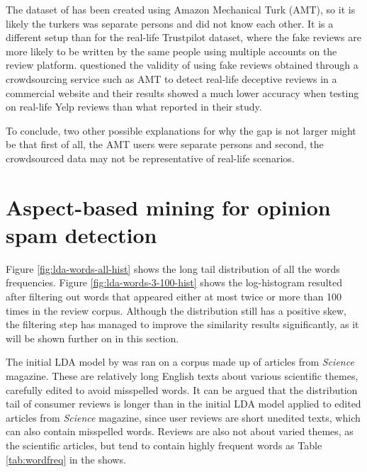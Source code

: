 The dataset of \citet{Ott2011} has been created using Amazon Mechanical Turk (AMT), so it is likely the turkers was separate persons and did not know each other. It is a different setup than for the real-life Trustpilot dataset, where the fake reviews are more likely to be written by the same people using multiple accounts on the review platform. \citet{Mukherjee2013a} questioned the validity of using fake reviews obtained through a crowdsourcing service such as AMT to detect real-life deceptive reviews in a commercial website and their results showed a much lower accuracy when testing on real-life Yelp reviews than what \citet{Ott2011} reported in their study. 

To conclude, two other possible explanations for why the gap is not larger might be that first of all, the AMT users were separate persons and second, the crowdsourced data may not be representative of real-life scenarios. 

\clearpage

\section{Aspect-based mining for opinion spam detection}

Figure \ref{fig:lda-words-all-hist} shows the long tail distribution of all the words frequencies.  Figure \ref{fig:lda-words-3-100-hist} shows the log-histogram resulted after filtering out words that appeared either at most twice or more than 100 times in the review corpus. Although the distribution still has a positive skew, the filtering step has managed to improve the similarity results significantly, as it will be shown further on in this section. 

The initial LDA model by \citet{Blei:2003:LDA:944919.944937} was ran on a corpus made up of articles from \textit{Science} magazine. These are relatively long English texts about various scientific themes, carefully edited to avoid misspelled words. It can be argued that the distribution tail of consumer reviews is longer than in the initial LDA model applied to edited articles from \textit{Science} magazine, since user reviews are short unedited texts, which can also contain misspelled words. Reviews are also not about varied themes, as the scientific articles, but tend to contain highly frequent words as Table \ref{tab:wordfreq} in the  shows.

